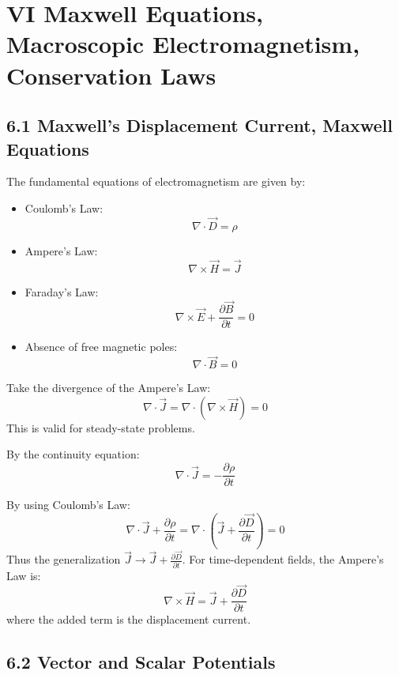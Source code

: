 \documentclass{article}
\begin{document}
	
	\section*{VI Maxwell Equations, Macroscopic Electromagnetism, Conservation Laws}
	
	\subsection*{6.1 Maxwell's Displacement Current, Maxwell Equations}
	
	The fundamental equations of electromagnetism are given by:
	\begin{itemize}
		\item Coulomb's Law: $$ \nabla \cdot \vec{D} = \rho $$
		\item Ampere's Law: $$ \nabla \times \vec{H} = \vec{J} $$
		\item Faraday's Law: $$ \nabla \times \vec{E} + \frac{\partial \vec{B}}{\partial t} = 0 $$
		\item Absence of free magnetic poles: $$ \nabla \cdot \vec{B} = 0 $$
	\end{itemize}
	
	Take the divergence of the Ampere's Law:
	$$ \nabla \cdot \vec{J} = \nabla \cdot (\nabla \times \vec{H}) = 0 $$
	This is valid for steady-state problems.
	
	By the continuity equation:
	$$ \nabla \cdot \vec{J} = -\frac{\partial \rho}{\partial t} $$
	
	By using Coulomb's Law:
	$$ \nabla \cdot \vec{J} + \frac{\partial \rho}{\partial t} = \nabla \cdot (\vec{J} + \frac{\partial \vec{D}}{\partial t}) = 0 $$
	Thus the generalization $\vec{J} \rightarrow \vec{J} + \frac{\partial \vec{D}}{\partial t}$. For time-dependent fields, the Ampere's Law is:
	$$ \nabla \times \vec{H} = \vec{J} + \frac{\partial \vec{D}}{\partial t} $$
	where the added term is the displacement current.
	
	\subsection*{6.2 Vector and Scalar Potentials}
	
\end{document}
